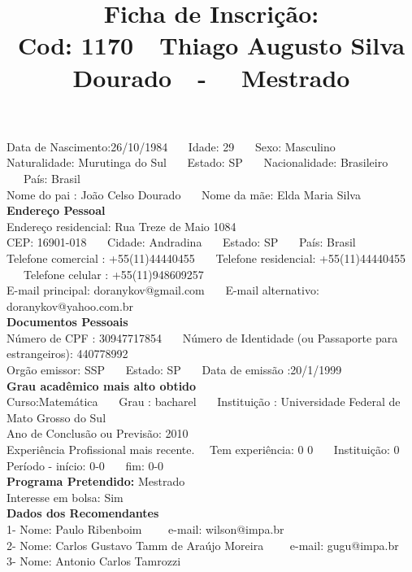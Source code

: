 \documentclass[11pt]{article}
\title{\vspace*{-4cm} Ficha de Inscrição: \\Cod: 1170\ \ Thiago Augusto Silva Dourado\ \ - \ \ Mestrado 
 }
\date{}
\begin{document}
\maketitle
\vspace*{-1.5cm}
\noindent Data de Nascimento:26/10/1984
\ \ \ Idade: 29   \ \ \ Sexo: Masculino
\\
Naturalidade: Murutinga do Sul  
\ \ \  Estado: SP
\ \ \  Nacionalidade: Brasileiro
\ \ \ País: Brasil
\\        
Nome do pai : João Celso Dourado
\ \ \ Nome da mãe: Elda Maria Silva          
\\[0.2cm]                     
\textbf{Endereço Pessoal} 
\\ 
\noindent Endereço residencial: Rua Treze de Maio 1084
\\
        CEP: 16901-018 
\ \ \ Cidade: Andradina 
\ \ \ Estado: SP 
\ \ \ País: Brasil
\\		
		Telefone comercial : +55(11)44440455
\ \ \ Telefone residencial: +55(11)44440455
\ \ \ Telefone celular : +55(11)948609257
\\
E-mail principal: doranykov@gmail.com
\ \ \ E-mail alternativo: doranykov@yahoo.com.br 
\\[0.2cm] 
\textbf{Documentos Pessoais}
\\
\noindent Número de CPF : 30947717854
\ \ \ Número de Identidade (ou Passaporte para estrangeiros): 440778992
\\
Orgão emissor: SSP
\ \ \ Estado: SP
\ \ \ Data de emissão :20/1/1999
\\[0.3cm]
\textbf{Grau acadêmico mais alto obtido}
\\	
Curso:Matemática
\ \ \ Grau : bacharel
\ \ \ Instituição : Universidade Federal de Mato Grosso do Sul
\\			
Ano de Conclusão ou Previsão: 2010
\\ 
Experiência Profissional mais recente. \ \  
Tem experiência: 0 0  
\ \ \ Instituição: 0
\\  
Período - início: 0-0
\ \ \ fim: 0-0
\\[0.2cm] 
\textbf{Programa Pretendido:} Mestrado\\
Interesse em bolsa: Sim
\\[0.3cm]		
\textbf{Dados dos Recomendantes} 
\\
1- Nome: Paulo Ribenboim
\ \ \ \  e-mail: wilson@impa.br 
\\
2- Nome: Carlos Gustavo Tamm de Araújo Moreira
\ \ \ \ e-mail: gugu@impa.br
\\
3- Nome: Antonio Carlos Tamrozzi
\end{document}
